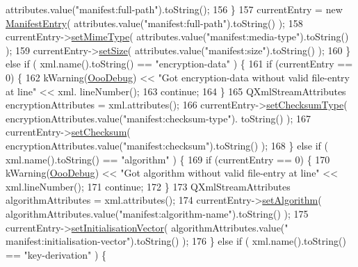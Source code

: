 \begin{DoxyCode}
      attributes.value(\textcolor{stringliteral}{"manifest:full-path"}).toString();
156     \}
157     currentEntry = \textcolor{keyword}{new} \hyperlink{classOOO_1_1ManifestEntry}{ManifestEntry}( attributes.value(\textcolor{stringliteral}{"manifest:full-path"}).toString() );
158     currentEntry->\hyperlink{classOOO_1_1ManifestEntry_ab100ed14298e33bb907752ad8e8d17f1}{setMimeType}( attributes.value(\textcolor{stringliteral}{"manifest:media-type"}).toString() );
159     currentEntry->\hyperlink{classOOO_1_1ManifestEntry_ae73f2907cba2cfec09e9203299ca701a}{setSize}( attributes.value(\textcolor{stringliteral}{"manifest:size"}).toString() );
160       \} \textcolor{keywordflow}{else} \textcolor{keywordflow}{if} ( xml.name().toString() == \textcolor{stringliteral}{"encryption-data"} ) \{
161     \textcolor{keywordflow}{if} (currentEntry == 0) \{
162       kWarning(\hyperlink{debug_8h_a7cc98d68e6cad31e47e0f4c94664c0da}{OooDebug}) << \textcolor{stringliteral}{"Got encryption-data without valid file-entry at line"} << xml.
      lineNumber();
163       \textcolor{keywordflow}{continue};
164     \}
165     QXmlStreamAttributes encryptionAttributes = xml.attributes();
166     currentEntry->\hyperlink{classOOO_1_1ManifestEntry_a4e69eda5242a4f4a4741a8d627f6962c}{setChecksumType}( encryptionAttributes.value(\textcolor{stringliteral}{"manifest:checksum-type"}).
      toString() );
167     currentEntry->\hyperlink{classOOO_1_1ManifestEntry_a48e5174537ba7916f143a9329a5b4218}{setChecksum}( encryptionAttributes.value(\textcolor{stringliteral}{"manifest:checksum"}).toString() );
168       \} \textcolor{keywordflow}{else} \textcolor{keywordflow}{if} ( xml.name().toString() == \textcolor{stringliteral}{"algorithm"} ) \{
169     \textcolor{keywordflow}{if} (currentEntry == 0) \{
170       kWarning(\hyperlink{debug_8h_a7cc98d68e6cad31e47e0f4c94664c0da}{OooDebug}) << \textcolor{stringliteral}{"Got algorithm without valid file-entry at line"} << xml.lineNumber();
171       \textcolor{keywordflow}{continue};
172     \}
173     QXmlStreamAttributes algorithmAttributes = xml.attributes();
174     currentEntry->\hyperlink{classOOO_1_1ManifestEntry_a77d0d27a37517813700ee830f9c11c72}{setAlgorithm}( algorithmAttributes.value(\textcolor{stringliteral}{"manifest:algorithm-name"}).toString()
       );
175     currentEntry->\hyperlink{classOOO_1_1ManifestEntry_a5a6783f55b0e2f5e9c41a77c518f9cb2}{setInitialisationVector}( algorithmAttributes.value(\textcolor{stringliteral}{"
      manifest:initialisation-vector"}).toString() );
176       \} \textcolor{keywordflow}{else} \textcolor{keywordflow}{if} ( xml.name().toString() == \textcolor{stringliteral}{"key-derivation"} ) \{

\end{DoxyCode}
